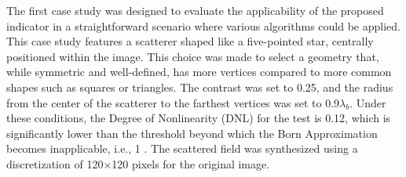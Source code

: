 \documentclass{IEEEtran}
\begin{document}
                The first case study was designed to evaluate the applicability of the proposed indicator in a straightforward scenario where various algorithms could be applied. This case study features a scatterer shaped like a five-pointed star, centrally positioned within the image. This choice was made to select a geometry that, while symmetric and well-defined, has more vertices compared to more common shapes such as squares or triangles. The contrast was set to 0.25, and the radius from the center of the scatterer to the farthest vertices was set to 0.9$\lambda_b$. Under these conditions, the Degree of Nonlinearity (DNL) for the test is 0.12, which is significantly lower than the threshold beyond which the Born Approximation becomes inapplicable, i.e., 1 \cite{bucci2001degree}. The scattered field was synthesized using a discretization of 120$\times$120 pixels for the original image.

\end{document}
